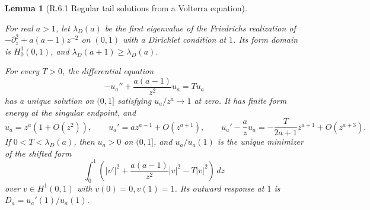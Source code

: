 \documentclass[11pt,a4paper]{article}
\theoremstyle{proofmanuscript}
\newtheorem{lemma}[theorem]{Lemma}
\begin{document}
\begin{lemma}[R.6.1 Regular tail solutions from a Volterra equation]\label{lem-regular-tail}

For real \(a>1\), let \(\lambda_D(a)\) be the first eigenvalue of the Friedrichs realization of \(-\partial_z^2+a(a-1)z^{-2}\) on \((0,1)\) with a Dirichlet condition at \(1\). Its form domain is \(H_0^1(0,1)\), and \(\lambda_D(a+1)\ge\lambda_D(a)\).

For every \(T>0\), the differential equation \[
-u_a''+\frac{a(a-1)}{z^2}u_a=Tu_a
\] has a unique solution on \((0,1]\) satisfying \(u_a/z^a\to1\) at zero. It has finite form energy at the singular endpoint, and \[
u_a=z^a(1+O(z^2)),\qquad
u_a'=az^{a-1}+O(z^{a+1}),\qquad
u_a'-\frac a z u_a=-\frac{T}{2a+1}z^{a+1}+O(z^{a+3}).
\] If \(0<T<\lambda_D(a)\), then \(u_a>0\) on \((0,1]\), and \(u_a/u_a(1)\) is the unique minimizer of the shifted form \[
\int_0^1\left(|v'|^2+\frac{a(a-1)}{z^2}|v|^2-T|v|^2\right)\,dz
\] over \(v\in H^1(0,1)\) with \(v(0)=0,v(1)=1\). Its outward response at \(1\) is \(D_a=u_a'(1)/u_a(1)\).

\end{lemma}
\end{document}
